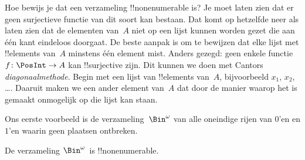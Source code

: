 \documentclass[openany]{memoir}
\begin{document}
Hoe bewijs je dat een verzameling !!{nonenumerable} is? Je moet laten
zien dat er geen surjectieve functie van dit soort kan bestaan. Dat
komt op hetzelfde neer als laten zien dat de elementen van~$A$ niet op
een lijst kunnen worden gezet die aan één kant eindeloos doorgaat. De beste
aanpak is om te bewijzen dat elke lijst met
!!{element}s van~$A$ minstens één element mist. Anders gezegd: geen
enkele functie $f\colon \PosInt \to A$ kan !!{surjective} zijn. Dit
kunnen we doen met Cantors \emph{diagonaalmethode}. Begin met een lijst
van !!{element}s van~$A$, bijvoorbeeld $x_1$, $x_2$, \dots. Daaruit
maken we een ander element van~$A$ dat door de manier waarop het is
gemaakt onmogelijk op die lijst kan staan.

Ons eerste voorbeeld is de verzameling~$\Bin^\omega$ van alle oneindige
rijen van $0$'en en $1$'en waarin geen plaatsen ontbreken.

\begin{thm}
De verzameling $\Bin^\omega$~is !!{nonenumerable}.
\end{thm}
\end{document}
